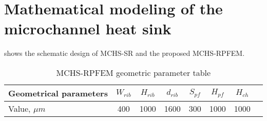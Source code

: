 %
% 
%

\section{Mathematical modeling of the microchannel heat sink}

shows the schematic design of MCHS-SR and the proposed MCHS-RPFEM.

\begin{table}[htbp]
    \scriptsize
    \caption{MCHS-RPFEM geometric parameter table}
    \begin{tabular}{lccccccc}
        \toprule
        Geometrical parameters & $W_{rib}$ & $H_{rib}$ & $d_{rib}$ & $S_{pf}$ & $H_{pf}$ & $H_{ch}$ \\
        \midrule
        Value, $\mu m$         & 400       & 1000      & 1600      & 300      & 1000     & 1000     \\
        \bottomrule
    \end{tabular}
    \label{tab:structure-parameter}
\end{table}